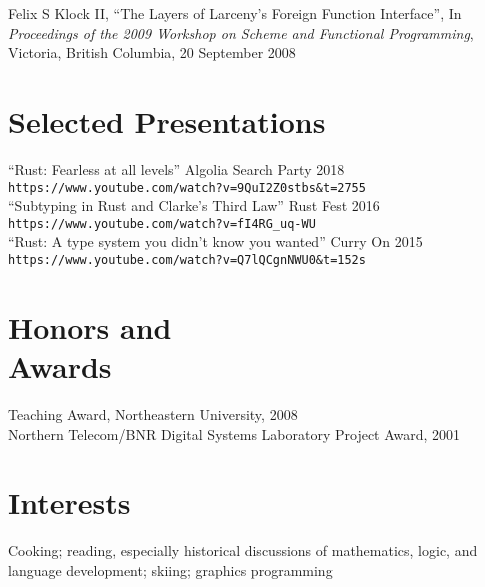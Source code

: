 \documentclass[margin,line,draft]{res}
\newcommand{\mysidestyle}{\sc}
\begin{document}
\begin{resume}
\vspace{-2mm}

    Felix S Klock II, ``The Layers of Larceny's Foreign Function Interface'', 
    In \textsl{Proceedings of the 2009 Workshop on Scheme and Functional Programming}, Victoria, British Columbia, 20 September 2008

    \section{\mysidestyle Selected Presentations}
    ``Rust: Fearless at all levels'' Algolia Search Party 2018\\ \verb|https://www.youtube.com/watch?v=9QuI2Z0stbs&t=2755|\\
    ``Subtyping in Rust and Clarke's Third Law'' Rust Fest 2016\\ \verb|https://www.youtube.com/watch?v=fI4RG_uq-WU|\\
    ``Rust: A type system you didn't know you wanted'' Curry On 2015\\ \verb|https://www.youtube.com/watch?v=Q7lQCgnNWU0&t=152s|\\
    \section{\mysidestyle Honors and\\Awards} 

    Teaching Award, Northeastern University, 2008 \vspace{1mm}\\%
    Northern Telecom/BNR Digital Systems Laboratory Project Award, 2001


    \section{\mysidestyle Interests}

    Cooking; 
    reading, especially historical discussions of mathematics, logic, 
    and language development; 
    skiing; 
    graphics programming

\end{resume}
\end{document}
